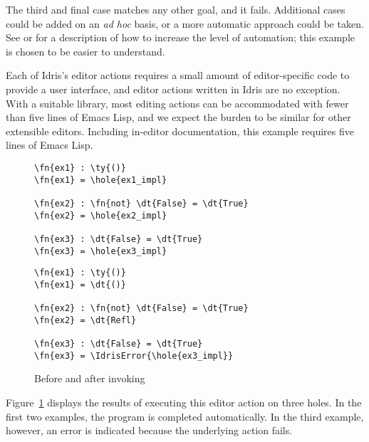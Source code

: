 The third and final case matches any other goal, and it
fails. Additional cases could be added on an \emph{ad hoc} basis, or a
more automatic approach could be taken. See \citet{davidphd} or
\citet{elabref} for a description of how to increase the level of
automation; this example is chosen to be easier to understand.

Each of Idris's editor actions requires a small amount of
editor-specific code to provide a user interface, and editor actions
written in Idris are no exception. With a suitable library, most
editing actions can be accommodated with fewer than five lines of
Emacs Lisp, and we expect the burden to be similar for other
extensible editors. Including in-editor documentation, this example
requires five lines of Emacs Lisp.

\begin{figure}[h]
\begin{BVerbatim}
\fn{ex1} : \ty{()}
\fn{ex1} = \hole{ex1_impl}

\fn{ex2} : \fn{not} \dt{False} = \dt{True}
\fn{ex2} = \hole{ex2_impl}

\fn{ex3} : \dt{False} = \dt{True}
\fn{ex3} = \hole{ex3_impl}
\end{BVerbatim}
\hspace{1em}
\begin{BVerbatim}
\fn{ex1} : \ty{()}
\fn{ex1} = \dt{()}

\fn{ex2} : \fn{not} \dt{False} = \dt{True}
\fn{ex2} = \dt{Refl}

\fn{ex3} : \dt{False} = \dt{True}
\fn{ex3} = \IdrisError{\hole{ex3_impl}}
\end{BVerbatim}

  \caption{Before and after invoking }
  \label{fig:motivating-example-exec}
\end{figure}

Figure~\ref{fig:motivating-example-exec} displays the results of
executing this editor action on three holes. In the first two
examples, the program is completed automatically. In the third
example, however, an error is indicated because the underlying
 action fails.


